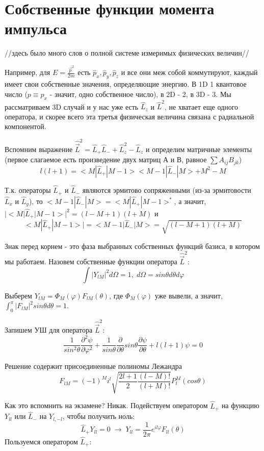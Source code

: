 \newpage
\chapter{Собственные функции момента импульса}
//здесь было много слов о полной системе измеримых физических величин//
\par Например, для $E=\frac{\vec{p}^2}{2m}$ есть $\hat{p}_x, \hat{p}_y, \hat{p}_z$  и все они меж собой коммутируют, каждый имеет свои собственные значения, определяющие энергию. В 1D 1 квантовое число ($p\equiv p_x$ - значит, одно собственное число), в 2D - 2, в 3D - 3. Мы рассматриваем 3D случай и у нас уже есть $\hat{L}_z$ и $\hat{L}^2$, не хватает еще одного оператора, и скорее всего эта третья физическая величина связана с радиальной компонентой.
\par Вспомним выражение $\hat{\vec{L}}^2=  \hat{L}_+\hat{L}_- + \hat{L}^2_z-\hat{L}_z$ и определим матричные элементы (первое слагаемое есть произведение двух матриц А и В, равное $\sum A_{ij}B_{jk}$)
$$l(l+1)= <M|\hat{L}_+|M-1><M-1|\hat{L}_-|M> + M^2 -M$$
\par Т.к. операторы $\hat{L}_+$ и $\hat{L}_-$ являются эрмитово сопряженными (из-за эрмитовости $\hat{L}_x$ и $\hat{L}_y$), то $<M-1|\hat{L}_-|M> = <M|\hat{L}_+|M-1>^*$, а значит, $|<M|\hat{L}_+|M-1>|^2=(l-M+1)(l+M)$ и 
$$<M|\hat{L}_+|M-1>|=<M-1|\hat{L}_-|M> = \sqrt{(l-M+1)(l+M)}$$
\par Знак перед корнем - это фаза выбранных собственных функций базиса, в котором мы работаем. Назовем собственные функции оператора $\hat{\vec{L}}^2$:
$$\int |Y_{lM}|^2 d \Omega = 1, \; d \Omega = sin \theta d\theta d\varphi$$
\par Выберем $Y_{lM} = \Phi_M(\varphi)F_{lM}(\theta)$, где $\Phi_M(\varphi)$ уже вывели, а значит, $\int^{\pi}_0 |F_{lM}|^2 sin\theta d \theta = 1$.
\par Запишем УШ для оператора $\hat{\vec{L}}^2$:
$$\frac{1}{sin^2\theta} \frac{\partial^2\psi}{\partial \varphi^2} +\frac{1}{sin\theta} \frac{\partial }{\partial \theta}sin \theta \frac{\partial \psi}{\partial \theta} +l(l+1)\psi =0$$
\par Решение содержит присоединенные полиномы Лежандра
$$F_{lM} = (-1)^M i^l \sqrt{\frac{2l+1}{2}\frac{(l-M)!}{(l+M)!}} P^M_l (cos\theta)$$
\par Как это вспомнить на экзамене? Никак. Подействуем оператором $\hat{L}_+$ на функцию $Y_{ll}$ или $\hat{L}_-$ на $Y_{l, -l}$, чтобы получить ноль:
$$\hat{L}_+Y_{ll} =0\; \rightarrow \; Y_{ll} = \frac{1}{2\pi} e^{il\varphi}F_{ll}(\theta)$$
\var Пользуемся оператором $\hat{L}_+$:
